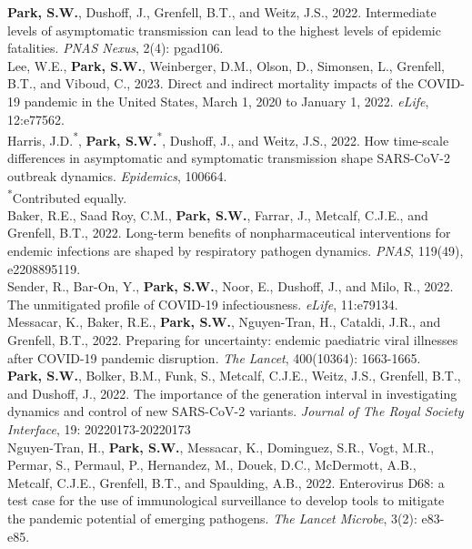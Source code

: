 \documentclass[11pt]{article} %
\begin{document}
 \textbf{Park, S.W.}, Dushoff, J., Grenfell, B.T., and Weitz, J.S., 2022. Intermediate levels of asymptomatic transmission can lead to the highest levels of epidemic fatalities. \textit{PNAS Nexus}, 2(4): pgad106.\\

 Lee, W.E., \textbf{Park, S.W.}, Weinberger, D.M., Olson, D., Simonsen, L., Grenfell, B.T., and Viboud, C., 2023. Direct and indirect mortality impacts of the COVID-19 pandemic in the United States, March 1, 2020 to January 1, 2022. \textit{eLife}, 12:e77562.\\

 Harris, J.D.\textsuperscript{*}, \textbf{Park, S.W.}\textsuperscript{*}, Dushoff, J., and Weitz, J.S., 2022. How time-scale differences in asymptomatic and symptomatic transmission shape SARS-CoV-2 outbreak dynamics. \textit{Epidemics}, 100664.\\
\textsuperscript{*}Contributed equally.\\

 Baker, R.E., Saad Roy, C.M., \textbf{Park, S.W.}, Farrar, J., Metcalf, C.J.E., and Grenfell, B.T., 2022. Long-term benefits of nonpharmaceutical interventions for endemic infections are shaped by respiratory pathogen dynamics. \textit{PNAS}, 119(49), e2208895119.\\

 Sender, R., Bar-On, Y., \textbf{Park, S.W.}, Noor, E., Dushoff, J., and Milo, R., 2022. The unmitigated profile of COVID-19 infectiousness. \textit{eLife}, 11:e79134.\\

 Messacar, K., Baker, R.E., \textbf{Park, S.W.}, Nguyen-Tran, H., Cataldi, J.R., and Grenfell, B.T., 2022. Preparing for uncertainty: endemic paediatric viral illnesses after COVID-19 pandemic disruption. \textit{The Lancet}, 400(10364): 1663-1665.\\

 \textbf{Park, S.W.}, Bolker, B.M., Funk, S., Metcalf, C.J.E., Weitz, J.S., Grenfell, B.T., and Dushoff, J., 2022. The importance of the generation interval in investigating dynamics and control of new SARS-CoV-2 variants. \textit{Journal of The Royal Society Interface}, 19: 20220173-20220173\\

 Nguyen-Tran, H., \textbf{Park, S.W.}, Messacar, K., Dominguez, S.R., Vogt, M.R., Permar, S., Permaul, P., Hernandez, M., Douek, D.C., McDermott, A.B., Metcalf, C.J.E., Grenfell, B.T., and Spaulding, A.B., 2022. Enterovirus D68: a test case for the use of immunological surveillance to develop tools to mitigate the pandemic potential of emerging pathogens. \textit{The Lancet Microbe}, 3(2): e83-e85.\\
\end{document}
